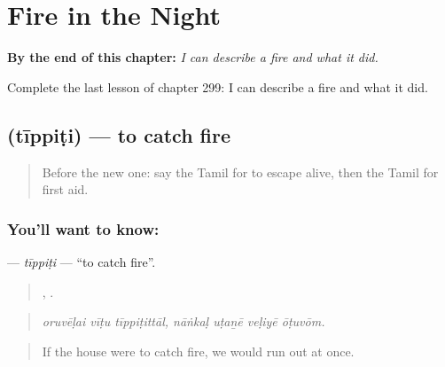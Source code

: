 
\chapter{Fire in the Night}
\label{ch:ta-fire-in-the-night}

\begin{chapteropening}
\textbf{By the end of this chapter:} \emph{I can describe a fire and what it did.}

Complete the last lesson of chapter 299: I can describe a fire and what it did.
\end{chapteropening}

\section[\texorpdfstring{\ta{தீப்பிடி} (tīppiṭi)}{தீப்பிடி (tīppiṭi)}]{ (tīppiṭi) — to catch fire}

\label{lesson:TA-C299-tippiti}



\begin{quote}
Before the new one: say the Tamil for to escape alive, then the Tamil for first aid.
\end{quote}

\subsection*{You'll want to know: }
\textbf{} — \emph{tīppiṭi} — \textquotedblleft{}to catch fire\textquotedblright{}.

\begin{quote}
  ,    .
\end{quote}

\begin{quote}
\emph{oruvēḷai vīṭu tīppiṭittāl, nāṅkaḷ uṭaṉē veḷiyē ōṭuvōm.}
\end{quote}

\begin{quote}
If the house were to catch fire, we would run out at once.
\end{quote}

